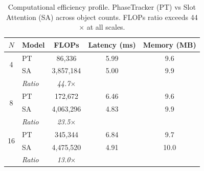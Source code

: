 \begin{table}[t]
\centering
\caption{Computational efficiency profile. PhaseTracker (PT) vs Slot Attention (SA) across object counts. FLOPs ratio exceeds 44$\times$ at all scales.}
\label{tab:efficiency}
\begin{tabular}{clccc}
\toprule
$N$ & Model & FLOPs & Latency (ms) & Memory (MB) \\
\midrule
\multirow{2}{*}{4} & PT & 86,336 & 5.99 & 9.6 \\
& SA & 3,857,184 & 5.00 & 9.9 \\
& \textit{Ratio} & \textit{44.7$\times$} & & \\
\midrule
\multirow{2}{*}{8} & PT & 172,672 & 6.46 & 9.6 \\
& SA & 4,063,296 & 4.83 & 9.9 \\
& \textit{Ratio} & \textit{23.5$\times$} & & \\
\midrule
\multirow{2}{*}{16} & PT & 345,344 & 6.84 & 9.7 \\
& SA & 4,475,520 & 4.91 & 10.0 \\
& \textit{Ratio} & \textit{13.0$\times$} & & \\
\bottomrule
\end{tabular}
\end{table}